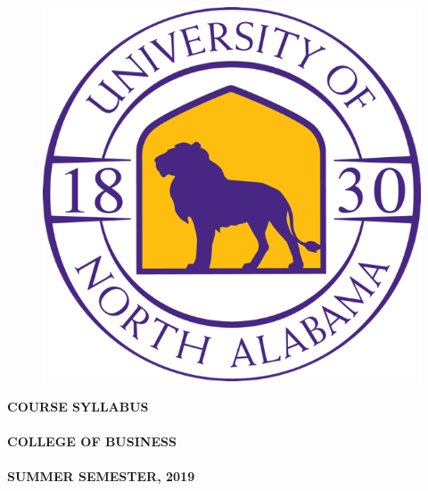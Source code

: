 \documentclass[12pt]{letter}
\newlength{\logowidth}
\newcommand{\customhref}[2]{
	\href{#1}{\color{blue}\burl{#2}}	
}
\newcommand{\semester}{SUMMER SEMESTER, 2019}
\begin{document}
\thispagestyle{empty}


\begin{large}


\begin{figure}
 \includegraphics[width=\logowidth]{img/approved_una_logo}
\end{figure}

\textbf{COURSE SYLLABUS}\\ \\
\textbf{COLLEGE OF BUSINESS}\\ \\
\textbf{\semester}
 
  \vspace*{28pt}
  \textbf{\course} \\ \\ 
  \textbf{\coursetitle}
\end{large}
\end{document}
